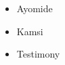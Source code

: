 \documentclass{article}
\begin{document}
	
	\begin{itemize}
		\item Ayomide
		\item Kamsi
		\item Testimony
	\end{itemize}
\end{document}
